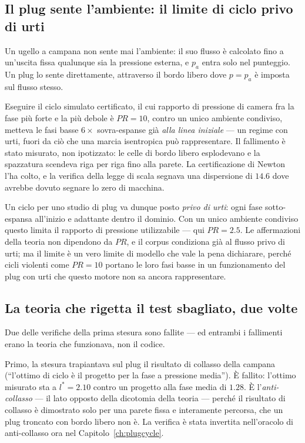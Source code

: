 \subsection{Il plug sente l'ambiente: il limite di ciclo privo di
urti}

Un ugello a campana non sente mai l'ambiente: il suo flusso è
calcolato fino a un'uscita fissa qualunque sia la pressione esterna, e
$p_a$ entra solo nel punteggio. Un plug lo sente direttamente,
attraverso il bordo libero dove $p = p_a$ è imposta sul flusso
stesso.

Eseguire il ciclo simulato certificato, il cui rapporto di pressione
di camera fra la fase più forte e la più debole è $PR = 10$, contro un
unico ambiente condiviso, metteva le fasi basse $6\times$
sovra-espanse già \emph{alla linea iniziale} --- un regime con urti,
fuori da ciò che una marcia isentropica può rappresentare. Il
fallimento è stato misurato, non ipotizzato: le celle di bordo libero
esplodevano e la spazzatura scendeva riga per riga fino alla parete.
La certificazione di Newton l'ha colto, e la verifica della legge di
scala segnava una dispersione di $14.6$ dove avrebbe dovuto segnare lo
zero di macchina.

Un ciclo per uno studio di plug va dunque posto \emph{privo di urti}:
ogni fase sotto-espansa all'inizio e adattante dentro il dominio. Con
un unico ambiente condiviso questo limita il rapporto di pressione
utilizzabile --- qui $PR = 2.5$. Le affermazioni della teoria non
dipendono da $PR$, e il corpus condiziona già al flusso privo di
urti; ma il limite è un vero limite di modello che vale la pena
dichiarare, perché cicli violenti come $PR = 10$ portano le loro fasi
basse in un funzionamento del plug con urti che questo motore non sa
ancora rappresentare.

\subsection{La teoria che rigetta il test sbagliato, due volte}

Due delle verifiche della prima stesura sono fallite --- ed entrambi i
fallimenti erano la teoria che funzionava, non il codice.

Primo, la stesura trapiantava sul plug il risultato di collasso della
campana (``l'ottimo di ciclo è il progetto per la fase a pressione
media''). È fallito: l'ottimo misurato sta a $l^{*} = 2.10$ contro un
progetto alla fase media di $1.28$. È l'\emph{anti-collasso} --- il
lato opposto della dicotomia della teoria --- perché il risultato di
collasso è dimostrato solo per una parete fissa e interamente
percorsa, che un plug troncato con bordo libero non è. La verifica è
stata invertita nell'oracolo di anti-collasso ora nel
Capitolo~\ref{ch:plugcycle}.

